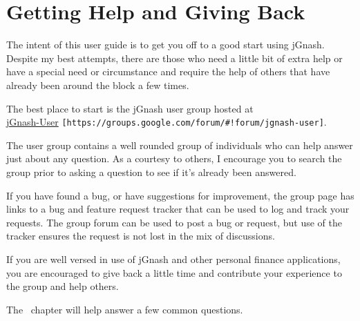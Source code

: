 \documentclass[letterpaper,12pt]{book}
\begin{document}

    \section{Getting Help and Giving Back}\label{sec:getting-help-and-giving-back}
    The intent of this user guide is to get you off to a good start using jGnash.
    Despite my best attempts, there are those who need a little bit of extra help or have a special need or
    circumstance and require the help of others that have already been around the block a few times.

    The best place to start is the jGnash user group hosted at \\
    \href{https://groups.google.com/forum/#!forum/jgnash-user}{jGnash-User} \texttt{[https://groups.google.com/forum/\#!forum/jgnash-user]}.

    The user group contains a well rounded group of individuals who can help answer just about any question.
    As a courtesy to others, I encourage you to search the group prior to asking a question to see if it's already
    been answered.

    If you have found a bug, or have suggestions for improvement, the group page has links to a bug and feature request
    tracker that can be used to log and track your requests.
    The group forum can be used to post a bug or request, but use of the tracker ensures the request is not lost in
    the mix of discussions.

    If you are well versed in use of jGnash and other personal finance applications, you are encouraged to give back a
    little time and contribute your experience to the group and help others.

    The~ chapter will help answer a few common questions.
      
\end{document}
